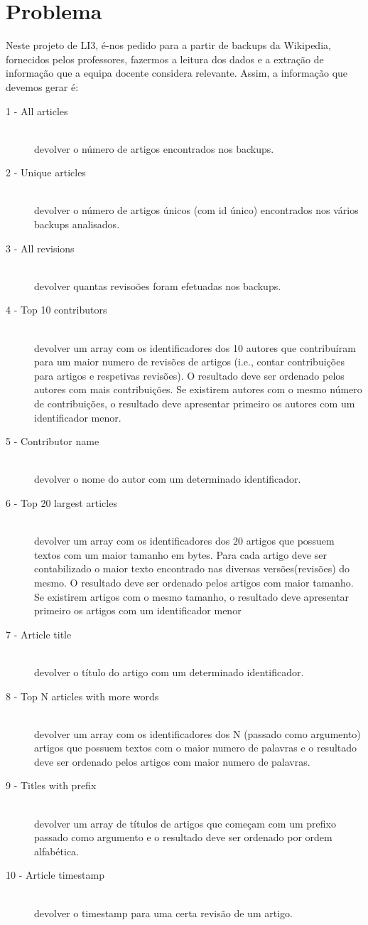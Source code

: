 \documentclass[a4paper]{article}
\begin{document}
\section{Problema}
\label{sec:problema}
Neste projeto de LI3, é-nos pedido para a partir de backups da Wikipedia, fornecidos pelos professores, fazermos a leitura dos dados e a extração de informação que a equipa docente considera relevante. Assim, a informação que devemos gerar é:	
\begin{description}
\item[1 - All articles]\hfill \\ 
devolver o número de artigos encontrados nos backups.
\item[2 - Unique articles]\hfill \\ 
devolver o número de artigos únicos (com id único) encontrados nos vários backups analisados.
\item[3 - All revisions]\hfill \\
devolver quantas revisoões foram efetuadas nos backups.
\item[4 - Top 10 contributors]\hfill \\
devolver um array com os identificadores dos 10 autores que contribuíram para um maior numero de revisões de artigos (i.e., contar contribuições para artigos e respetivas revisões). O resultado deve ser ordenado pelos autores com mais contribuições. Se existirem autores com o mesmo número de contribuições, o resultado deve apresentar primeiro os autores com um identificador menor.
\item[5 - Contributor name]\hfill \\
devolver o nome do autor com um determinado identificador.
\item[6 - Top 20 largest articles]\hfill \\
devolver um array com os identificadores dos 20 artigos que possuem textos com um maior tamanho em bytes. Para cada artigo deve ser contabilizado o maior texto encontrado nas diversas versões(revisões) do mesmo. O resultado deve ser ordenado pelos artigos com maior tamanho. Se existirem artigos com o mesmo tamanho, o resultado deve apresentar primeiro os artigos com um identificador menor
\item[7 - Article title]\hfill \\
devolver o título do artigo com um determinado identificador.
\item[8 - Top N articles with more words]\hfill \\
devolver um array com os identificadores dos N (passado como argumento) artigos que possuem textos com o maior numero de palavras e o resultado deve ser ordenado pelos artigos com maior numero de palavras.
\item[9 - Titles with prefix]\hfill \\
devolver um array de títulos de artigos que começam com um prefixo passado como argumento e o resultado deve ser ordenado por ordem alfabética.
\item[10 - Article timestamp]\hfill \\
devolver o timestamp para uma certa revisão de um artigo.
\end{description}
\end{document}
